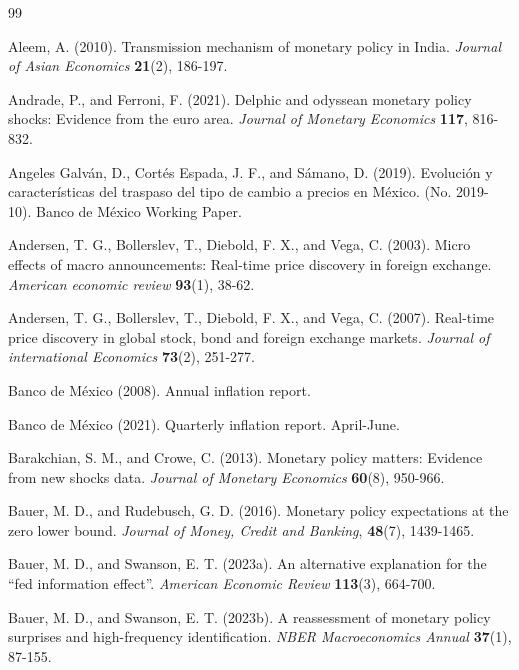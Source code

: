 \documentclass[12pt, reqno]{article}
\begin{document}
\newpage

\begin{thebibliography}{99}

\bibitem{} \hypertarget{Aleem (2010)}{} 
Aleem, A. (2010). Transmission mechanism of monetary policy in India. \textit{Journal of Asian Economics} \textbf{21}(2), 186-197.

\bibitem{} \hypertarget{Andrade and Ferroni (2021)}{} Andrade, P., and Ferroni, F. (2021). Delphic and odyssean monetary policy shocks: Evidence from the euro area. \textit{Journal of Monetary Economics} \textbf{117}, 816-832.

\bibitem{} \hypertarget{Angeles et al. (2019)}{}
Angeles Galván, D., Cortés Espada, J. F., and Sámano, D. (2019). Evolución y características del traspaso del tipo de cambio a precios en México. (No. 2019-10). Banco de México Working Paper.

\bibitem{} \hypertarget{Andersen et al. (2003)}{} 
Andersen, T. G., Bollerslev, T., Diebold, F. X., and Vega, C. (2003). Micro effects of macro announcements: Real-time price discovery in foreign exchange. \textit{American economic review} \textbf{93}(1), 38-62.

\bibitem{} \hypertarget{Andersen et al. (2007)}{} 
Andersen, T. G., Bollerslev, T., Diebold, F. X., and Vega, C. (2007). Real-time price discovery in global stock, bond and foreign exchange markets. \textit{Journal of international Economics} \textbf{73}(2), 251-277.

\bibitem{} \hypertarget{Banco de Mexico (2008)}{} Banco de México (2008). Annual inflation report.

\bibitem{} \hypertarget{Bancoa}{} Banco de México (2021). Quarterly inflation report. April-June.

\bibitem{} \hypertarget{Barakchian and Crowe (2013)}{} 
Barakchian, S. M., and Crowe, C. (2013). Monetary policy matters: Evidence from new shocks data. \textit{Journal of Monetary Economics} \textbf{60}(8), 950-966.

\bibitem{} \hypertarget{Bauer and Rudebusch (2016)}{} 
Bauer, M. D., and Rudebusch, G. D. (2016). Monetary policy expectations at the zero lower bound. \textit{Journal of Money, Credit and Banking}, \textbf{48}(7), 1439-1465.

\bibitem{} \hypertarget{Bauer and Swanson (2023a)}{} 
Bauer, M. D., and Swanson, E. T. (2023a). An alternative explanation for the ``fed information effect''. \textit{American Economic Review} \textbf{113}(3), 664-700.

\bibitem{} \hypertarget{Bauer and Swanson (2023b)}{} 
Bauer, M. D., and Swanson, E. T. (2023b). A reassessment of monetary policy surprises and high-frequency identification. \textit{NBER Macroeconomics Annual} \textbf{37}(1), 87-155.


\end{thebibliography}
\end{document}
